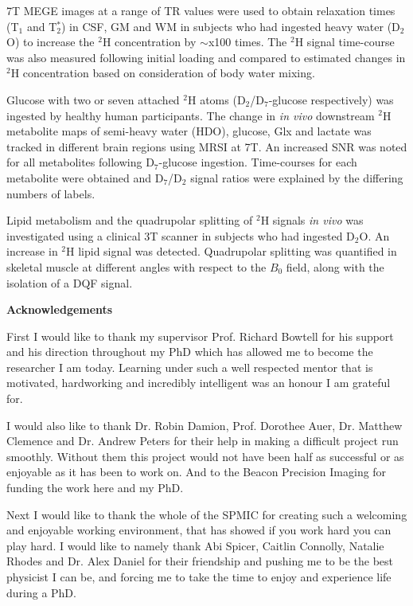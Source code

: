 \documentclass[12pt,english]{report}
\begin{document}
7T \ac{MEGE} images at a range of \ac{TR} values were used to obtain relaxation times (T$_1$ and T$_2^*$) in \ac{CSF}, \ac{GM} and \ac{WM} in subjects who had ingested heavy water (D$_2$O) to increase the $^2$H concentration by $\sim$x100 times. The $^2$H signal time-course was also measured following initial loading and compared to estimated changes in $^2$H concentration based on consideration of body water mixing.

Glucose with two or seven attached $^2$H atoms (D$_2$/D$_7$-glucose respectively) was ingested by healthy human participants. The change in \textit{in vivo} downstream $^2$H metabolite maps of semi-heavy water (HDO), glucose, Glx and lactate was tracked in different brain regions using \ac{MRSI} at 7T. An increased \ac{SNR} was noted for all metabolites following D$_7$-glucose ingestion. Time-courses for each metabolite were obtained and D$_7$/D$_2$ signal ratios were explained by the differing numbers of labels.

Lipid metabolism and the quadrupolar splitting of $^2$H signals \textit{in vivo} was investigated using a clinical 3T scanner in subjects who had ingested D$_2$O. An increase in $^2$H lipid signal was detected. Quadrupolar splitting was quantified in skeletal muscle at different angles with respect to the $B_0$ field, along with the isolation of a \ac{DQF} signal.

\newpage
\vspace*{\fill}

\newpage
\thispagestyle{plain}
\begin{center}
    \textbf{Acknowledgements}
\end{center}
First I would like to thank my supervisor Prof. Richard Bowtell for his support and his direction throughout my PhD which has allowed me to become the researcher I am today. Learning under such a well respected mentor that is motivated, hardworking and incredibly intelligent was an honour I am grateful for. 

I would also like to thank Dr. Robin Damion, Prof. Dorothee Auer, Dr. Matthew Clemence and Dr. Andrew Peters for their help in making a difficult project run smoothly. Without them this project would not have been half as successful or as enjoyable as it has been to work on. And to the Beacon Precision Imaging for funding the work here and my PhD.

Next I would like to thank the whole of the SPMIC for creating such a welcoming and enjoyable working environment, that has showed if you work hard you can play hard. I would like to namely thank Abi Spicer, Caitlin Connolly, Natalie Rhodes and Dr. Alex Daniel for their friendship and pushing me to be the best physicist I can be, and forcing me to take the time to enjoy and experience life during a PhD.
\end{document}
